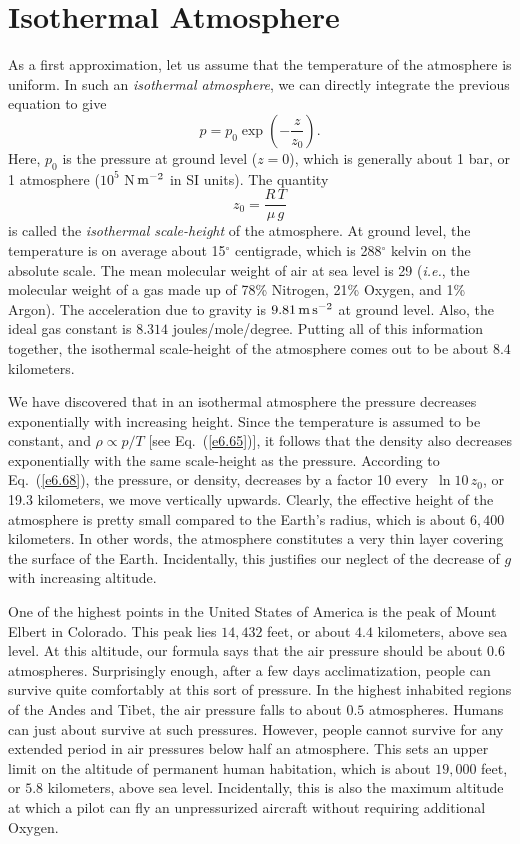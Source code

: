 \section{Isothermal Atmosphere}
As a first approximation,
let us assume  that the temperature of the atmosphere is  uniform. In such an
{\em isothermal atmosphere}, we can directly integrate the previous equation
to give
\begin{equation}
p = p_0 \exp\left(-\frac{z}{z_0}\right).\label{e6.68}
\end{equation}
Here, $p_0$ is the pressure at ground level ($z=0$), which is generally about
1 bar, or 1 atmosphere ($10^5$ N\,${\rm m}^{-2}$ in SI units). 
The quantity
\begin{equation}
z_0 = \frac{R\,T}{\mu \,g}
\end{equation}
is called the {\em isothermal scale-height}\/ of the atmosphere. 
At ground level, the temperature is on average about 15$^\circ$ centigrade,
which is 288$^\circ$ kelvin  on the absolute scale. The mean molecular weight of air
at sea level is 29 ({\em i.e.},  the molecular weight of a gas made up of
78\% Nitrogen, 21\% Oxygen, and 1\% Argon). 
The acceleration due to gravity is $9.81\,{\rm m}\,{\rm s}^{-2}$ at
ground level. Also, the ideal gas constant is
$8.314$ joules/mole/degree. Putting all of this information together, 
the isothermal scale-height of the atmosphere comes out to be about $8.4$ kilometers.

We have discovered that in an isothermal atmosphere the pressure 
decreases  exponentially with increasing height. 
Since the temperature is assumed to be constant, and $\rho\propto 
p/T$ [see Eq.~(\ref{e6.65})],
it follows that the density also decreases exponentially with the same scale-height
as the pressure.
According to Eq.~(\ref{e6.68}), the
pressure, or density, 
 decreases by a factor 10 every \,$\ln \!10\, z_0$, or 19.3 kilometers,
we move vertically upwards. Clearly, the effective height of the atmosphere is
pretty small compared to the  Earth's radius, which is about $6,400$ kilometers.
In other words, the atmosphere constitutes a very thin layer covering
the surface of the Earth.
Incidentally, this justifies our neglect of the decrease of $g$ with increasing
altitude.

One of the highest points in the United States of America is
the peak of Mount Elbert in Colorado.
This peak lies $14,432$ feet, or about $4.4$ kilometers, above sea level. At this altitude, our
 formula says that the air pressure should be about $0.6$ atmospheres. 
Surprisingly enough, after a few days
acclimatization, people can survive quite comfortably at this sort of
pressure.
 In the highest inhabited regions of the Andes and Tibet, the air pressure 
falls to about $0.5$ atmospheres. Humans can just about survive at such
pressures. However, people cannot survive for any extended period in air pressures
below half an atmosphere. This sets an upper limit on the altitude of permanent
human habitation,  which is about $19,000$ feet, or $5.8$ kilometers, above
sea level. Incidentally, this is also the maximum altitude at which a pilot
can fly an unpressurized
aircraft without requiring additional Oxygen. 


